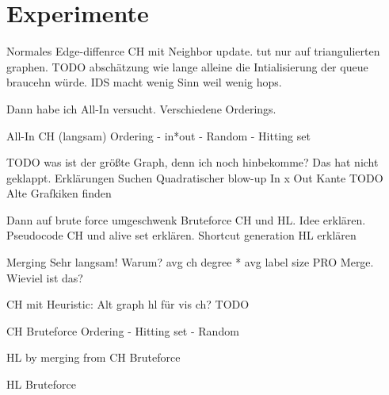 \chapter{Experimente}


Normales Edge-diffenrce CH mit Neighbor update.
tut nur auf triangulierten graphen.
TODO abschätzung wie lange alleine die Intialisierung der queue braucehn würde.
IDS macht wenig Sinn weil wenig hops.


Dann habe ich All-In versucht.
Verschiedene Orderings.

All-In CH (langsam)
Ordering
- in*out
- Random
- Hitting set

TODO was ist der größte Graph, denn ich noch hinbekomme?
Das hat nicht geklappt.
Erklärungen Suchen
Quadratischer blow-up In x Out Kante
TODO Alte Grafkiken finden




Dann auf brute force umgeschwenk
Bruteforce CH und HL.
Idee erklären.
Pseudocode CH und alive set erklären.
Shortcut generation
HL erklären


Merging
Sehr langsam!
Warum?
avg ch degree * avg label size PRO Merge. Wieviel ist das?




CH mit Heuristic:
Alt
graph hl für vis ch? TODO

CH Bruteforce
Ordering
- Hitting set
- Random

HL by merging from CH Bruteforce

HL Bruteforce


